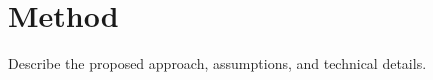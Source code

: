 \section{Method}
\label{sec:method}

Describe the proposed approach, assumptions, and technical details.
